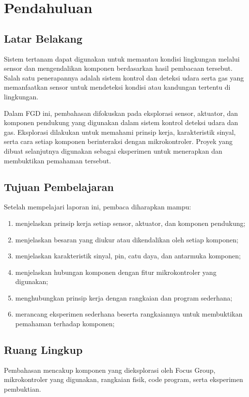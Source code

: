 \section{Pendahuluan}

\subsection{Latar Belakang}
Sistem tertanam dapat digunakan untuk memantau kondisi lingkungan melalui sensor dan mengendalikan komponen berdasarkan hasil pembacaan tersebut. Salah satu penerapannya adalah sistem kontrol dan deteksi udara serta gas yang memanfaatkan sensor untuk mendeteksi kondisi atau kandungan tertentu di lingkungan.

Dalam FGD ini, pembahasan difokuskan pada eksplorasi sensor, aktuator, dan komponen pendukung yang digunakan dalam sistem kontrol deteksi udara dan gas. Eksplorasi dilakukan untuk memahami prinsip kerja, karakteristik sinyal, serta cara setiap komponen berinteraksi dengan mikrokontroler. Proyek yang dibuat selanjutnya digunakan sebagai eksperimen untuk menerapkan dan membuktikan pemahaman tersebut.

\subsection{Tujuan Pembelajaran}
Setelah mempelajari laporan ini, pembaca diharapkan mampu:
\begin{enumerate}
  \item menjelaskan prinsip kerja setiap sensor, aktuator, dan komponen pendukung;
  \item menjelaskan besaran yang diukur atau dikendalikan oleh setiap komponen;
  \item menjelaskan karakteristik sinyal, pin, catu daya, dan antarmuka komponen;
  \item menjelaskan hubungan komponen dengan fitur mikrokontroler yang digunakan;
  \item menghubungkan prinsip kerja dengan rangkaian dan program sederhana;
  \item merancang eksperimen sederhana beserta rangkaiannya untuk membuktikan pemahaman terhadap komponen;
\end{enumerate}

\subsection{Ruang Lingkup}
Pembahasan mencakup komponen yang dieksplorasi oleh Focus Group, mikrokontroler yang digunakan, rangkaian fisik, code program, serta eksperimen pembuktian.

